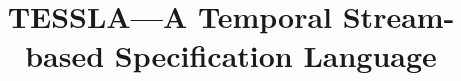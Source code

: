\documentclass{article}
\title{TESSLA---A Temporal Stream-based Specification Language}
\title{\thetitle}
\begin{document}
\maketitle







\appendix



\nocite{*}


%
\end{document}
